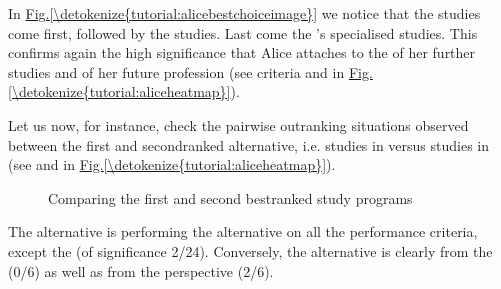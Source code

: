 \documentclass[a4paper,12pt,english]{sphinxhowto}
\let\sphinxpxdimen\pdfpxdimen\else\newdimen\sphinxpxdimen
\begin{document}
In \hyperref[\detokenize{tutorial:alicebestchoiceimage}]{Fig.\@ \ref{\detokenize{tutorial:alicebestchoiceimage}}} we notice that the  studies come first, followed by the  studies. Last come the ’s specialised studies. This confirms again the high significance that Alice attaches to the  of her further studies and of her future profession (see criteria  and  in \hyperref[\detokenize{tutorial:aliceheatmap}]{Fig.\@ \ref{\detokenize{tutorial:aliceheatmap}}}).

Let us now, for instance, check the pairwise outranking situations observed between the first and second\sphinxhyphen{}ranked alternative, i.e.  studies in  versus  studies in  (see  and  in \hyperref[\detokenize{tutorial:aliceheatmap}]{Fig.\@ \ref{\detokenize{tutorial:aliceheatmap}}}).

\begin{sphinxVerbatim}[commandchars=\\\{\}]
\end{sphinxVerbatim}

\begin{figure}[H]
\centering
\capstart

\noindent\sphinxincludegraphics[width=550\sphinxpxdimen]{{pairwiseComparison}.png}
\caption{Comparing the first and second best\sphinxhyphen{}ranked study programs}\label{\detokenize{tutorial:pairwisecomparison}}\end{figure}

The  alternative is performing  the  alternative on all the performance criteria, except the  (of significance 2/24). Conversely, the  alternative is clearly  from the  (0/6) as well as from the  perspective (2/6).
\end{document}
